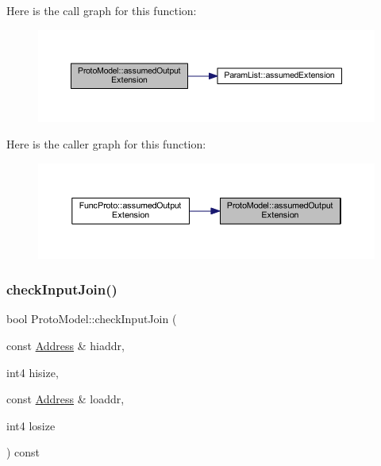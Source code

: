 Here is the call graph for this function\+:
\nopagebreak
\begin{figure}[H]
\begin{center}
\leavevmode
\includegraphics[width=350pt]{class_proto_model_a74ad1cd29d07b30a4525049a6b2ee270_cgraph}
\end{center}
\end{figure}
Here is the caller graph for this function\+:
\nopagebreak
\begin{figure}[H]
\begin{center}
\leavevmode
\includegraphics[width=350pt]{class_proto_model_a74ad1cd29d07b30a4525049a6b2ee270_icgraph}
\end{center}
\end{figure}
\mbox{\label{class_proto_model_a06031cb84a876e36a3648362c4af8662}} 
\subsubsection{\texorpdfstring{checkInputJoin()}{checkInputJoin()}}
{\footnotesize\ttfamily bool Proto\+Model\+::check\+Input\+Join (\begin{DoxyParamCaption}\item[{const \mbox{\hyperlink{class_address}{Address}} \&}]{hiaddr,  }\item[{int4}]{hisize,  }\item[{const \mbox{\hyperlink{class_address}{Address}} \&}]{loaddr,  }\item[{int4}]{losize }\end{DoxyParamCaption}) const\hspace{0.3cm}{\ttfamily [inline]}}



